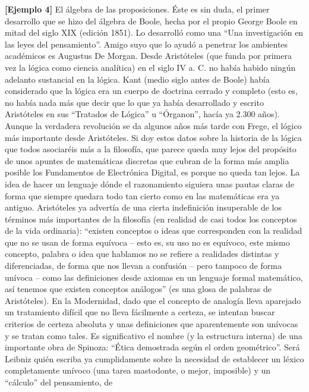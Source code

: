\documentclass[
]{article}
\begin{document}
\begin{enumerate}
  \textbf{{[}Ejemplo 4{]}} El álgebra de las proposiciones. Éste es sin
  duda, el primer desarrollo que se hizo del álgebra de Boole, hecha por
  el propio George Boole en mitad del siglo XIX (edición 1851). Lo
  desarrolló como una ``Una investigación en las leyes del
  pensamiento''. Amigo suyo que lo ayudó a penetrar los ambientes
  académi\-cos es Augustus De Morgan. Desde Aristóteles (que funda por
  primera vez la ló\-gica como ciencia analítica) en el siglo IV a. C.
  no había habido ningún adelanto sustancial en la lógica. Kant (medio
  siglo antes de Boole) había considerado que la lógica era un cuerpo de
  doctrina cerrado y completo (esto es, no había nada más que decir que
  lo que ya había desarrollado y escrito Aristóteles en sus ``Tra\-tados
  de Lógica'' u ``Órganon'', hacía ya 2.300 años). Aunque la verdadera
  revolu\-ción se da algunos años más tarde con Frege, el lógico más
  importante desde Aristóteles. Si doy estos datos sobre la historia de
  la lógica que todos asociaréis más a la filosofía, que parece queda
  muy lejos del propósito de unos apuntes de matemáticas discretas que
  cubran de la forma más amplia posible los Fundamentos de Electró\-nica
  Digital, es porque no queda tan lejos. La idea de hacer un len\-guaje
  dónde el razonamiento siguiera unas pautas claras de forma que siempre
  quedara todo tan cierto como en las matemáticas era ya antiguo.
  Aristóteles ya advertía de una cierta indefinición insuperable de los
  términos más importantes de la filosofía (en realidad de casi todos
  los conceptos de la vida ordinaria): ``exis\-ten conceptos o ideas que
  corresponden con la realidad que no se usan de forma equívoca -- esto
  es, su uso no es equívoco, este mismo concepto, palabra o idea que
  hablamos no se refiere a realidades distintas y diferenciadas, de
  forma que nos llevan a confusión -- pero tampoco de forma unívoca --
  como las definiciones desde axiomas en un lenguaje formal matemático,
  así tenemos que existen con\-ceptos análogos'' (es una glosa de
  palabras de Aristóteles). En la Modernidad, dado que el concepto de
  analogía lleva aparejado un tratamiento difícil que no lleva
  fácilmente a certeza, se intentan buscar criterios de certeza absoluta
  y unas definiciones que aparentemente son unívocas y se tratan como
  tales. Es significativo el nombre (y la estructura interna) de una
  importante obra de Spino\-za: ``Ética demostrada según el orden
  geométrico''. Será Leibniz quién escriba ya cumplidamente sobre la
  necesidad de establecer un léxico completamente unívoco (una tarea
  mastodonte, o mejor, imposible) y un ``cálculo'' del pensamiento, de

\end{enumerate}
\end{document}
